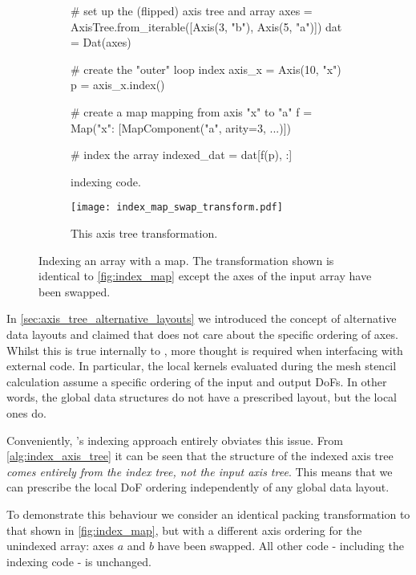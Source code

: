 \documentclass[thesis]{subfiles}
\begin{document}
\begin{figure}
  \centering
  \begin{subfigure}{.9\textwidth}
    \begin{pyalg2}
      # set up the (flipped) axis tree and array
      axes = AxisTree.from_iterable([Axis(3, "b"), Axis(5, "a")])
      dat = Dat(axes)

      # create the "outer" loop index
      axis_x = Axis(10, "x")
      p = axis_x.index()

      # create a map mapping from axis "x" to "a"
      f = Map({"x": [MapComponent("a", arity=3, ...)]})

      # index the array
      indexed_dat = dat[f(p), :]
    \end{pyalg2}

    \caption{ indexing code.}
    \label{fig:index_map_swap_code}
  \end{subfigure}

  \vspace{1em}

  \begin{subfigure}{\textwidth}
    \centering
    \texttt{[image: index\_map\_swap\_transform.pdf]}
    \caption{This axis tree transformation.}
    \label{fig:index_map_swap_transform}
  \end{subfigure}

  \caption{
    Indexing an array with a map.
    The transformation shown is identical to \cref{fig:index_map} except the axes of the input array have been swapped.
  }
\end{figure}

In \cref{sec:axis_tree_alternative_layouts} we introduced the concept of alternative data layouts and claimed that  does not care about the specific ordering of axes.
Whilst this is true internally to , more thought is required when interfacing with external code.
In particular, the local kernels evaluated during the mesh stencil calculation assume a specific ordering of the input and output DoFs.
In other words, the global data structures do not have a prescribed layout, but the local ones do.

Conveniently, 's indexing approach entirely obviates this issue.
From \cref{alg:index_axis_tree} it can be seen that the structure of the indexed axis tree \emph{comes entirely from the index tree, not the input axis tree}.
This means that we can prescribe the local DoF ordering independently of any global data layout.

To demonstrate this behaviour we consider an identical packing transformation to that shown in \cref{fig:index_map}, but with a different axis ordering for the unindexed array: axes $a$ and $b$ have been swapped.
All other code - including the indexing code - is unchanged.
\end{document}
